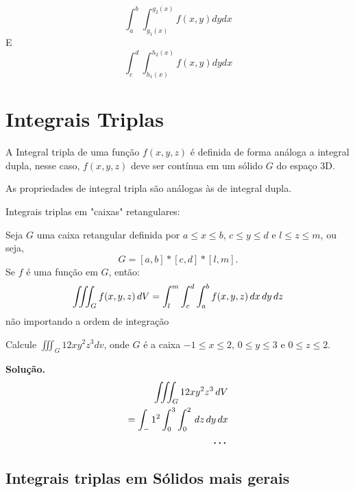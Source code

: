 \documentclass[portugues, 11pt]{article}
\begin{document}
	\begin{equation}
		\int_a^b\int_{g_{1}(x)}^{g_{2}(x)}{f(x,y) dydx}
	\end{equation}
	E
	\begin{equation}
		\int_c^d\int_{h_{1}(x)}^{h_{2}(x)}{f(x,y) dydx}
	\end{equation}
	
	
	\section{Integrais Triplas}
	A Integral tripla de uma função $f(x,y,z)$ é definida de forma análoga a integral dupla, nesse caso, $f(x,y,z)$ deve ser contínua em um sólido $G$ do espaço 3D.

	As propriedades de integral tripla são análogas às de integral dupla.

	Integrais triplas em "caixas" retangulares:

	\begin{thrm}
		Seja $G$ uma caixa retangular definida por $a\leq x \leq b$, $c \leq y \leq d$ e $l \leq z \leq m$, ou seja, 
		\begin{equation}
			G = [a,b]*[c,d]*[l,m].
		\end{equation}
		Se $f$ é uma função em $G$, então:
		\begin{equation}
			\iiint_G f(x,y,z) \,dV  \\
			= \int_l^m\int_c^d\int_a^b f(x,y,z) \,dx\,dy\,dz
		\end{equation}
		não importando a ordem de integração
	\end{thrm}

	\begin{exmp}
		Calcule $ \iiint_G {12xy^2z^3}{dv}$, onde $G$ é a caixa $-1 \leq x \leq 2$, $0 \leq y \leq 3$ e $0 \leq z \leq 2$.
		
		\textbf{Solução.}
		\begin{align*}
			\iiint_G 12xy^2z^3 \,dV \\
			= \int_-1^2\int_0^3\int_0^2 \,dz\,dy\,dx \\
			\textbf{\dots}
		\end{align*}
		

	\end{exmp}
	
	\subsection{Integrais triplas em Sólidos mais gerais}
	
\end{document}

